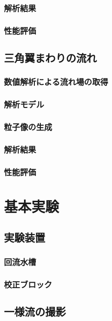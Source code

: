 \documentclass[twocolumn,a4j]{jsarticle}
\begin{document}
\subsubsection{解析結果}
\subsubsection{性能評価}

 \baselineskip
\subsection{三角翼まわりの流れ}
\subsubsection{数値解析による流れ場の取得}
\subsubsection{解析モデル}
\subsubsection{粒子像の生成}
\subsubsection{解析結果}
\subsubsection{性能評価}

\newpage
\section{基本実験}
 \baselineskip
\subsection{実験装置}
\subsubsection{回流水槽}
\subsubsection{校正ブロック}

 \baselineskip
\subsection{一様流の撮影}
\end{document}
